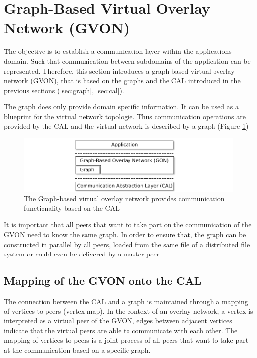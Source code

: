 
\section{Graph-Based Virtual Overlay Network (GVON)}
The objective is to establish a communication layer within the
applications domain. Such that communication between subdomains of the
application can be represented. Therefore, this section introduces a
graph-based virtual overlay network (GVON), that is based on the graphs and the
CAL introduced in the previous sections (\ref{sec:graph},
\ref{sec:cal}). 

The graph does only provide domain specific information.  It can be
used as a blueprint for the virtual network topologie.  Thus
communication operations are provided by the CAL and the virtual
network is described by a graph (Figure \ref{fig:gon})

\begin{figure}[H]
  \centering \includegraphics[width=\textwidth]{graphics/30_gon}
  \caption{The Graph-based virtual overlay network provides communication
    functionality based on the CAL}
  \label{fig:gon}
\end{figure}

It is important that all peers that want to take part on the
communication of the GVON need to know the same graph. In order to
ensure that, the graph can be constructed in parallel by all peers,
loaded from the same file of a distributed file system or could even
be delivered by a master peer.

\subsection{Mapping of the GVON onto the CAL}
\label{sec:mapping}
The connection between the CAL and a graph is maintained through a
mapping of vertices to peers (vertex map). In the context of an
overlay network, a vertex is interpreted as a virtual peer of the GVON,
edges between adjacent vertices indicate that the virtual peers are
able to communicate with each other. The mapping of vertices to peers
is a joint process of all peers that want to take part at the
communication based on a specific graph.

